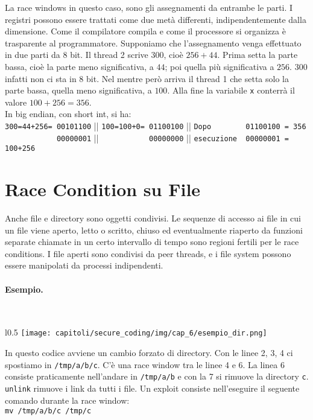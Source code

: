 La race windows in questo caso, sono gli assegnamenti da entrambe le parti.
I registri possono essere trattati come due metà differenti, indipendentemente dalla dimensione.
Come il compilatore compila e come il processore si organizza è trasparente al programmatore.
Supponiamo che l'assegnamento venga effettuato in due parti da 8 bit.
Il thread 2 scrive 300, cioè $256+44$. Prima setta la parte bassa, cioè la parte meno significativa, a $44$; poi quella più significativa a $256$.
$300$ infatti non ci sta in 8 bit.
Nel mentre però arriva il thread 1 che setta solo la parte bassa, quella meno significativa, a $100$.
Alla fine la variabile \verb|x| conterrà il valore $100+256=356$. \\
In big endian, con short int, si ha:\\
\verb|300=44+256= 00101100| || \verb|100=100+0= 01100100| || \verb|Dopo        01100100 = 356|\\
\verb|            00000001| || \verb|           00000000| || \verb|esecuzione  00000001 = 100+256|


\section{Race Condition su File}

Anche file e directory sono oggetti condivisi.
Le sequenze di accesso ai file in cui un file viene aperto, letto o scritto,
chiuso ed
eventualmente riaperto da funzioni separate chiamate in un certo intervallo di
tempo sono
regioni fertili per le race conditions. I file aperti sono condivisi da
peer threads, e i file system
possono essere manipolati da processi indipendenti.

\paragraph{Esempio.}\ \\

\begin{wrapfigure}{l}{0.5\textwidth}
    \centering
    \texttt{[image: capitoli/secure\_coding/img/cap\_6/esempio\_dir.png]}
\end{wrapfigure}

In questo codice avviene un cambio forzato di directory.
Con le linee 2, 3, 4 ci spostiamo in
\verb|/tmp/a/b/c|.
C'è una race window tra le linee 4 e 6. La linea 6 consiste
praticamente nell'andare in \verb|/tmp/a/b| e con la 7 si rimuove la
directory \verb|c|. \verb|unlink| rimuove i link da tutti i file.
Un exploit consiste nell'eseguire il seguente comando durante
la race window:\\
\verb|mv /tmp/a/b/c /tmp/c|\\


